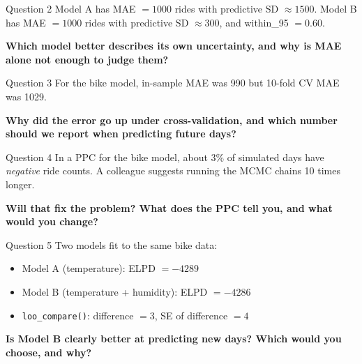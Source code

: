 \documentclass[aspectratio=43,11pt]{beamer}
\begin{document}
\begin{frame}{Question 2}
  Model A has MAE $= 1000$ rides with predictive SD $\approx 1500$.
  Model B has MAE $= 1000$ rides with predictive SD $\approx 300$,
  and within\_95 $= 0.60$.
  \vspace{0.6em}

  \textbf{Which model better describes its own uncertainty, and why is
  MAE alone not enough to judge them?}
\end{frame}

\begin{frame}{Question 3}
  For the bike model, in-sample MAE was 990 but 10-fold CV MAE was 1029.
  \vspace{0.6em}

  \textbf{Why did the error go up under cross-validation, and which
  number should we report when predicting future days?}
\end{frame}

\begin{frame}{Question 4}
  In a PPC for the bike model, about 3\% of simulated days have
  \emph{negative} ride counts. A colleague suggests running the MCMC
  chains 10 times longer.
  \vspace{0.6em}

  \textbf{Will that fix the problem? What does the PPC tell you, and
  what would you change?}
\end{frame}

\begin{frame}{Question 5}
  Two models fit to the same bike data:
  \vspace{0.4em}
  \begin{itemize}
    \item Model A (temperature): ELPD $= -4289$
    \item Model B (temperature + humidity): ELPD $= -4286$
    \item \texttt{loo\_compare()}: difference $= 3$, SE of difference $= 4$
  \end{itemize}
  \vspace{0.6em}
  \textbf{Is Model B clearly better at predicting new days?
  Which would you choose, and why?}
\end{frame}
\end{document}
